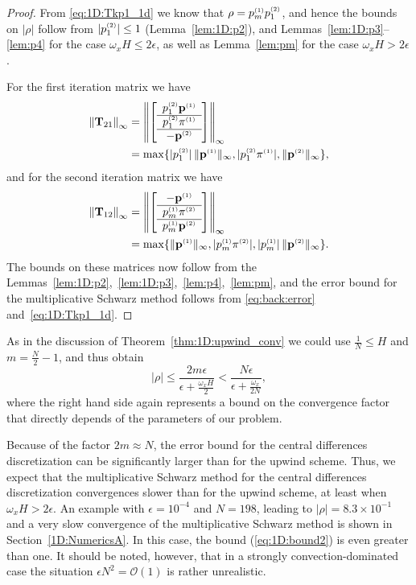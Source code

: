 \begin{proof}
From \eqref{eq:1D:Tkp1_1d} we know that $\rho=p^{\scriptscriptstyle (1)}_m p^{\scriptscriptstyle (2)}_1$, and hence the bounds
on $|\rho|$ follow from $|p^{\scriptscriptstyle (2)}_1|\leq 1$ (Lemma~\ref{lem:1D:p2}), and
Lemmas~\ref{lem:1D:p3}--\ref{lem:p4} for the case $\omega_x H\leq 2\epsilon$, as
well as Lemma~\ref{lem:pm} for the case $\omega_x H > 2\epsilon$.

For the first iteration matrix we have
%
\begin{align*}
\left\Vert\mathbf{T}_{21}\right\Vert_\infty &=
\left\Vert\left[\begin{array}{c}
p^{\scriptscriptstyle (2)}_{1}\mathbf{p}^{\scriptscriptstyle (1)}\\
\hline p^{\scriptscriptstyle (2)}_{1}\pi^{\scriptscriptstyle (1)}\\
\hline -\mathbf{p}^{\scriptscriptstyle (2)}
\end{array}\right]\right\Vert_\infty\\
&=\max\{|p^{\scriptscriptstyle (2)}_{1}|\,\|\mathbf{p}^{\scriptscriptstyle (1)}\|_\infty, |p^{\scriptscriptstyle (2)}_{1}\pi^{\scriptscriptstyle (1)}|, \|\mathbf{p}^{\scriptscriptstyle (2)}\|_\infty\},
\end{align*}
%
and for the second iteration matrix we have
%
\begin{align*}
 \left\Vert\mathbf{T}_{12}\right\Vert_\infty &= \left\Vert\left[\begin{array}{c}
-\mathbf{p}^{\scriptscriptstyle (1)}\\
\hline p^{\scriptscriptstyle (1)}_{m}\pi^{\scriptscriptstyle (2)}\\
\hline p^{\scriptscriptstyle (1)}_{m}\mathbf{p}^{\scriptscriptstyle (2)}
\end{array}\right]\right\Vert_\infty \\
&= \max\{\|\mathbf{p}^{\scriptscriptstyle (1)}\|_\infty, |p^{\scriptscriptstyle (1)}_{m}\pi^{\scriptscriptstyle (2)}|, |p^{\scriptscriptstyle (1)}_{m}|\,\|\mathbf{p}^{\scriptscriptstyle (2)}\|_\infty\}.
\end{align*}
%
The bounds on these matrices now follow from the
Lemmas~\ref{lem:1D:p2},~\ref{lem:1D:p3},~\ref{lem:p4},~\ref{lem:pm},
and the error bound for the multiplicative Schwarz method follows from
\eqref{eq:back:error} and~\eqref{eq:1D:Tkp1_1d}.
%
\end{proof}

As in the discussion of Theorem~\ref{thm:1D:upwind_conv}
we could use $\frac{1}{N} \leq H$ and $m=\frac{N}{2}-1$, and thus obtain
$$
|\rho|\leq \frac{2m\epsilon}{\epsilon+\frac{\omega_x H}{2}} <
\frac{N\epsilon}{\epsilon+\frac{\omega_x}{2N}},
$$
where the right hand side again represents a bound on the convergence factor
that directly depends of the parameters of our problem.

Because of the factor $2m\approx N$, the error bound for the central
differences discretization can be significantly larger than for the upwind
scheme. Thus, we expect that the multiplicative Schwarz method for the central
differences discretization convergences slower than for the upwind scheme, at
least when $\omega_x H>2\epsilon$. An example with $\epsilon=10^{-4}$ and
$N=198$, leading to $|\rho|=8.3\times 10^{-1}$ and a very slow convergence of
the multiplicative Schwarz method is shown in Section~\ref{1D:NumericsA}.
In this case, the bound (\ref{eq:1D:bound2}) is even greater than one.  It
should be noted, however, that in a strongly convection-dominated case the
situation $\epsilon N^2=\mathscr{O}(1)$ is rather unrealistic.

